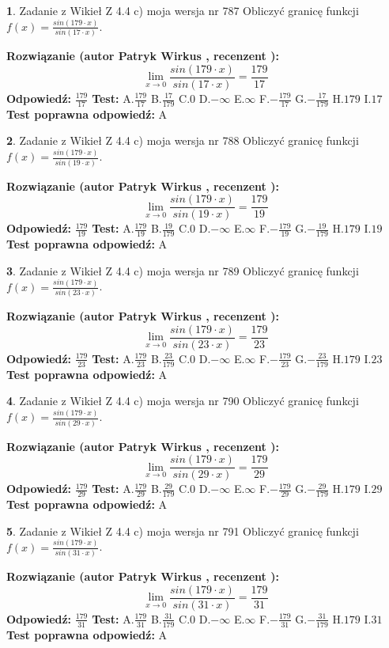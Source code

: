 \documentclass[12pt, a4paper]{article}
\theoremstyle{definition} %
\newtheorem{zad}{}
\newcommand{\zadStart}[1]{\begin{zad}#1\newline}
\newcommand{\zadStop}{\end{zad}}
\newcommand{\rozwStart}[2]{\noindent \textbf{Rozwiązanie (autor #1 , recenzent #2): }\newline}
\newcommand{\rozwStop}{\newline}
\newcommand{\odpStart}{\noindent \textbf{Odpowiedź:}\newline}
\newcommand{\odpStop}{\newline}
\newcommand{\testStart}{\noindent \textbf{Test:}\newline}
\newcommand{\testStop}{\newline}
\newcommand{\kluczStart}{\noindent \textbf{Test poprawna odpowiedź:}\newline}
\newcommand{\kluczStop}{\newline}
\begin{document}
\zadStart{Zadanie z Wikieł Z 4.4 c) moja wersja nr 787}
Obliczyć granicę funkcji $f(x)=\frac{sin(179\cdot x)}{sin(17\cdot x)}$.
\zadStop
\rozwStart{Patryk Wirkus}{}
$$\lim\limits_{x\to 0}\frac{sin(179\cdot x)}{sin(17\cdot x)}=
\frac{179}{17}$$
\rozwStop
\odpStart
$\frac{179}{17}$
\odpStop
\testStart
A.$\frac{179}{17}$
B.$\frac{17}{179}$
C.$0$
D.$-\infty$
E.$\infty$
F.$-\frac{179}{17}$
G.$-\frac{17}{179}$
H.$179$
I.$17$
\testStop
\kluczStart
A
\kluczStop



\zadStart{Zadanie z Wikieł Z 4.4 c) moja wersja nr 788}
Obliczyć granicę funkcji $f(x)=\frac{sin(179\cdot x)}{sin(19\cdot x)}$.
\zadStop
\rozwStart{Patryk Wirkus}{}
$$\lim\limits_{x\to 0}\frac{sin(179\cdot x)}{sin(19\cdot x)}=
\frac{179}{19}$$
\rozwStop
\odpStart
$\frac{179}{19}$
\odpStop
\testStart
A.$\frac{179}{19}$
B.$\frac{19}{179}$
C.$0$
D.$-\infty$
E.$\infty$
F.$-\frac{179}{19}$
G.$-\frac{19}{179}$
H.$179$
I.$19$
\testStop
\kluczStart
A
\kluczStop



\zadStart{Zadanie z Wikieł Z 4.4 c) moja wersja nr 789}
Obliczyć granicę funkcji $f(x)=\frac{sin(179\cdot x)}{sin(23\cdot x)}$.
\zadStop
\rozwStart{Patryk Wirkus}{}
$$\lim\limits_{x\to 0}\frac{sin(179\cdot x)}{sin(23\cdot x)}=
\frac{179}{23}$$
\rozwStop
\odpStart
$\frac{179}{23}$
\odpStop
\testStart
A.$\frac{179}{23}$
B.$\frac{23}{179}$
C.$0$
D.$-\infty$
E.$\infty$
F.$-\frac{179}{23}$
G.$-\frac{23}{179}$
H.$179$
I.$23$
\testStop
\kluczStart
A
\kluczStop



\zadStart{Zadanie z Wikieł Z 4.4 c) moja wersja nr 790}
Obliczyć granicę funkcji $f(x)=\frac{sin(179\cdot x)}{sin(29\cdot x)}$.
\zadStop
\rozwStart{Patryk Wirkus}{}
$$\lim\limits_{x\to 0}\frac{sin(179\cdot x)}{sin(29\cdot x)}=
\frac{179}{29}$$
\rozwStop
\odpStart
$\frac{179}{29}$
\odpStop
\testStart
A.$\frac{179}{29}$
B.$\frac{29}{179}$
C.$0$
D.$-\infty$
E.$\infty$
F.$-\frac{179}{29}$
G.$-\frac{29}{179}$
H.$179$
I.$29$
\testStop
\kluczStart
A
\kluczStop



\zadStart{Zadanie z Wikieł Z 4.4 c) moja wersja nr 791}
Obliczyć granicę funkcji $f(x)=\frac{sin(179\cdot x)}{sin(31\cdot x)}$.
\zadStop
\rozwStart{Patryk Wirkus}{}
$$\lim\limits_{x\to 0}\frac{sin(179\cdot x)}{sin(31\cdot x)}=
\frac{179}{31}$$
\rozwStop
\odpStart
$\frac{179}{31}$
\odpStop
\testStart
A.$\frac{179}{31}$
B.$\frac{31}{179}$
C.$0$
D.$-\infty$
E.$\infty$
F.$-\frac{179}{31}$
G.$-\frac{31}{179}$
H.$179$
I.$31$
\testStop
\kluczStart
A
\kluczStop
\end{document}
